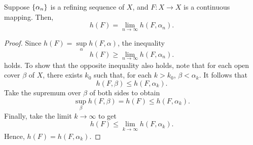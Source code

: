 \documentclass[12pt,twoside,draft]{book}
\begin{document}
\begin{theorem}
  Suppose $\left \{ \alpha_n \right \}$ is a refining sequence of $X$, and $F:X\to X$ is a continuous mapping.
  Then,
  \begin{equation*}
    h(F) = \lim\limits_{n\to \infty} h(F, \alpha_n).
  \end{equation*}
  \label{thm:t-ent-ref-seq}
  \begin{proof}
    Since $h(F) = \sup\limits_{\alpha} h(F, \alpha)$, the inequality
    \begin{equation*}
      h(F) \geq \lim\limits_{n\to \infty} h(F, \alpha_n).
    \end{equation*}
    holds.
    To show that the opposite inequality also holds, note that for each open cover $\beta$ of $X$, there exists $k_0$ such that, for each $k > k_0$, $\beta < \alpha_k$.
    It follows that
    \begin{equation*}
      h(F, \beta) \leq h(F, \alpha_k).
    \end{equation*}
    Take the supremum over $\beta$ of both sides to obtain
    \begin{equation*}
      \sup\limits_{\beta} h(F, \beta) = h(F) \leq h(F, \alpha_k).
    \end{equation*}
    Finally, take the limit $k \to \infty$ to get
    \begin{equation*}
      h(F) \leq \lim\limits_{k \to \infty} h(F, \alpha_k).
    \end{equation*}
    Hence, $h(F) = h(F, \alpha_k)$.
  \end{proof}
\end{theorem}
\end{document}
